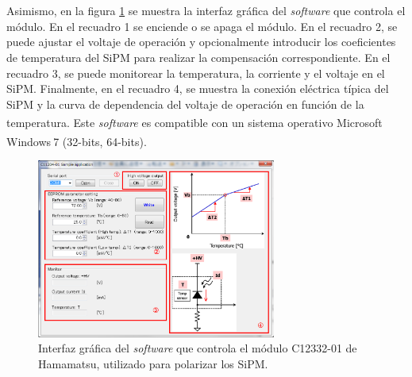 \\ \\
Asimismo, en la figura \ref{fig:interfase} se muestra la interfaz  gráfica del \textit{software} que controla el módulo. En el recuadro 1 se enciende o se apaga el módulo. En el recuadro 2, se puede ajustar el voltaje de operación y opcionalmente introducir los coeficientes de temperatura del SiPM  para realizar la compensación correspondiente. En el recuadro 3, se puede monitorear la temperatura, la corriente y el voltaje en el SiPM. Finalmente, en el recuadro 4, se muestra la conexión eléctrica típica del SiPM y la curva de dependencia del voltaje de operación en función de la temperatura. Este \textit{software} es compatible con un sistema operativo Microsoft\textsuperscript \textregistered$~$ Windows\textsuperscript \textregistered $~$7 (32-bits, 64-bits).

\begin{figure}[h!]
\begin{centering}
  \includegraphics[width=0.7\textwidth]{Images/Source_Interfaz.PNG}
    \caption{Interfaz gráfica del \textit{software} que controla el módulo  C12332-01 de Hamamatsu, utilizado para polarizar los SiPM.}
    \label{fig:interfase}
  \par\end{centering}
\end{figure}

